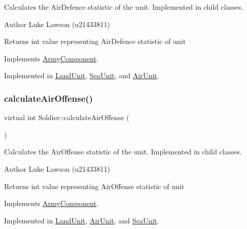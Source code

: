 Calculates the Air\+Defence statistic of the unit. Implemented in child classes. 

\begin{DoxyAuthor}{Author}
Luke Lawson (u21433811) 
\end{DoxyAuthor}
\begin{DoxyReturn}{Returns}
int value representing Air\+Defence statistic of unit 
\end{DoxyReturn}


Implements \mbox{\hyperlink{class_army_component_a9f6671dd8cd4037722f592f0fa86e3a2}{Army\+Component}}.



Implemented in \mbox{\hyperlink{class_land_unit_acf9d648efacea20a028b2d9dcaca0d64}{Land\+Unit}}, \mbox{\hyperlink{class_sea_unit_ab05ac5cd7be62a139c16f36146c17b00}{Sea\+Unit}}, and \mbox{\hyperlink{class_air_unit_a78796cdf870a76c072e89445a4c8ba15}{Air\+Unit}}.

\mbox{\label{class_soldier_ad5290f69e84772e9a3bfc060b5d348a0}} 
\subsubsection{\texorpdfstring{calculateAirOffense()}{calculateAirOffense()}}
{\footnotesize\ttfamily virtual int Soldier\+::calculate\+Air\+Offense (\begin{DoxyParamCaption}{ }\end{DoxyParamCaption})\hspace{0.3cm}{\ttfamily [pure virtual]}}



Calculates the Air\+Offense statistic of the unit. Implemented in child classes. 

\begin{DoxyAuthor}{Author}
Luke Lawson (u21433811) 
\end{DoxyAuthor}
\begin{DoxyReturn}{Returns}
int value representing Air\+Offense statistic of unit 
\end{DoxyReturn}


Implements \mbox{\hyperlink{class_army_component_aeea4bed9a4850e9b74f9306a8443085c}{Army\+Component}}.



Implemented in \mbox{\hyperlink{class_land_unit_af6b72446b89f0cceda3e71f0ccefd41e}{Land\+Unit}}, \mbox{\hyperlink{class_air_unit_a522f54b197f6b2daf784f4a9eacb9edc}{Air\+Unit}}, and \mbox{\hyperlink{class_sea_unit_aa2d92acd5e3798fdddfa860d5a9d346b}{Sea\+Unit}}.

